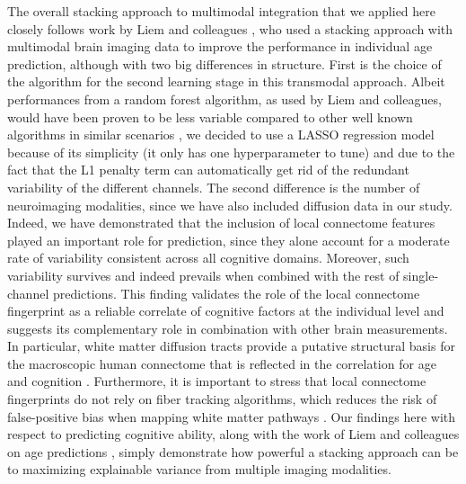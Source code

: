 \documentclass[10pt,letterpaper]{article}
\begin{document}
The overall stacking approach to multimodal integration that we applied here closely follows work by Liem and colleagues  \cite{LIEM2017179}, who used a stacking approach with multimodal brain imaging data to improve the performance in individual age prediction, although with two big differences in structure. First is the choice of the algorithm for the second learning stage in this transmodal approach. Albeit performances from a random forest algorithm, as used by Liem and colleagues, would have been proven to be less variable compared to other well known algorithms in similar scenarios \cite{7543531}, we decided to use a LASSO regression model because of its simplicity (it only has one hyperparameter to tune) and due to the fact that the L1 penalty term can automatically get rid of the redundant variability of the different channels. The second difference is the number of neuroimaging modalities, since we have also included diffusion data in our study. Indeed, we have demonstrated that the inclusion of local connectome features played an important role for prediction, since they alone account for a moderate rate of variability consistent across all cognitive domains. Moreover, such variability survives and indeed prevails  when combined with the rest of single-channel predictions. This finding validates the role of the local connectome fingerprint as a reliable correlate of cognitive factors at the individual level \cite{powell_local_2017} and suggests its complementary role in combination with other brain measurements. In particular, white matter diffusion tracts provide a putative structural basis for the macroscopic human connectome that is reflected in the correlation for age \cite{doi:10.1002/hbm.24312} and cognition \cite{Ferguson2017, Hearne2016}. Furthermore, it is important to stress that local connectome fingerprints do not rely on fiber tracking algorithms, which reduces the risk of false-positive bias when mapping white matter pathways \cite{Thomas16574, ReveleyE2820, Daducci2016}. Our findings here with respect to predicting cognitive ability, along with the work of Liem and colleagues on age predictions \cite{LIEM2017179}, simply demonstrate how powerful a stacking approach can be to maximizing explainable variance from multiple imaging modalities.
\end{document}
